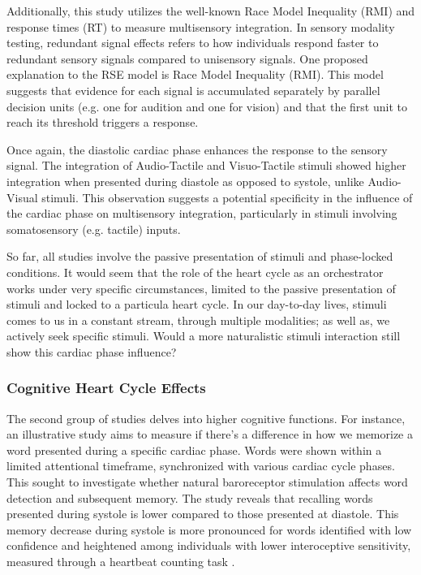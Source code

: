 \documentclass[12pt,oneside,openright]{report}
\begin{document}
Additionally, this study utilizes the well-known Race Model Inequality (RMI) and response times (RT) to measure multisensory integration. In sensory modality testing, redundant signal effects refers to how individuals respond faster to redundant sensory signals compared to unisensory signals. One proposed explanation to the RSE model is Race Model Inequality (RMI). This model suggests that evidence for each signal is accumulated separately by parallel decision units (e.g. one for audition and one for vision) and that the first unit to reach its threshold triggers a response\parencite{Innes2019ACA,MILLER1982247}. 

Once again, the diastolic cardiac phase enhances the response to the sensory signal. The integration of Audio-Tactile and Visuo-Tactile stimuli showed higher integration when presented during diastole as opposed to systole, unlike Audio-Visual stimuli. This observation suggests a potential specificity in the influence of the cardiac phase on multisensory integration, particularly in stimuli involving somatosensory (e.g. tactile) inputs.

So far, all studies involve the passive presentation of stimuli and phase-locked conditions. It would seem that the role of the heart cycle as an orchestrator works under very specific circumstances, limited to the passive presentation of stimuli and locked to a particula heart cycle. In our day-to-day lives, stimuli comes to us in a constant stream, through multiple modalities; as well as, we actively seek specific stimuli. Would a more naturalistic stimuli interaction still show this cardiac phase influence?

\subsubsection*{Cognitive Heart Cycle Effects}

The second group of studies delves into higher cognitive functions. For instance, an illustrative study aims to measure if there's a difference in how we memorize a word presented during a specific cardiac phase. Words were shown within a limited attentional timeframe, synchronized with various cardiac cycle phases. This sought to investigate whether natural baroreceptor stimulation affects word detection and subsequent memory. The study reveals that recalling words presented during systole is lower compared to those presented at diastole. This memory decrease during systole is more pronounced for words identified with low confidence and heightened among individuals with lower interoceptive sensitivity, measured through a heartbeat counting task \parencite{Garfinkel2013-cy}.
\end{document}
